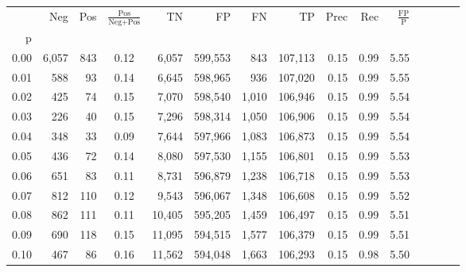 \begin{tabular}{rrrcrrrrrrrrrrr}
\toprule
{} &     Neg &     Pos & $\frac{\text{Pos}}{\text{Neg}+\text{Pos}}$ &       TN &       FP &       FN &       TP &  Prec &   Rec & $\frac{\text{FP}}{\text{P}}$ \\
p    &         &         &                                            &          &          &          &          &       &       &                              \\
\midrule
0.00 &   6,057 &     843 &                                       0.12 &    6,057 &  599,553 &      843 &  107,113 &  0.15 &  0.99 &                         5.55 \\
0.01 &     588 &      93 &                                       0.14 &    6,645 &  598,965 &      936 &  107,020 &  0.15 &  0.99 &                         5.55 \\
0.02 &     425 &      74 &                                       0.15 &    7,070 &  598,540 &    1,010 &  106,946 &  0.15 &  0.99 &                         5.54 \\
0.03 &     226 &      40 &                                       0.15 &    7,296 &  598,314 &    1,050 &  106,906 &  0.15 &  0.99 &                         5.54 \\
0.04 &     348 &      33 &                                       0.09 &    7,644 &  597,966 &    1,083 &  106,873 &  0.15 &  0.99 &                         5.54 \\
0.05 &     436 &      72 &                                       0.14 &    8,080 &  597,530 &    1,155 &  106,801 &  0.15 &  0.99 &                         5.53 \\
0.06 &     651 &      83 &                                       0.11 &    8,731 &  596,879 &    1,238 &  106,718 &  0.15 &  0.99 &                         5.53 \\
0.07 &     812 &     110 &                                       0.12 &    9,543 &  596,067 &    1,348 &  106,608 &  0.15 &  0.99 &                         5.52 \\
0.08 &     862 &     111 &                                       0.11 &   10,405 &  595,205 &    1,459 &  106,497 &  0.15 &  0.99 &                         5.51 \\
0.09 &     690 &     118 &                                       0.15 &   11,095 &  594,515 &    1,577 &  106,379 &  0.15 &  0.99 &                         5.51 \\
0.10 &     467 &      86 &                                       0.16 &   11,562 &  594,048 &    1,663 &  106,293 &  0.15 &  0.98 &                         5.50 \\

\end{tabular}
